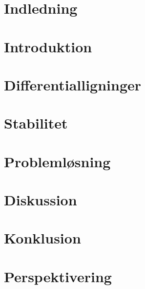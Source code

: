 

 



\chapter{Indledning}
    

\chapter{Introduktion}
    

\chapter{Differentialligninger}
    





    
\chapter{Stabilitet}
    

\chapter{Problemløsning}
    

\chapter{Diskussion}
    
    
\chapter{Konklusion}
    

\chapter{Perspektivering}
    





